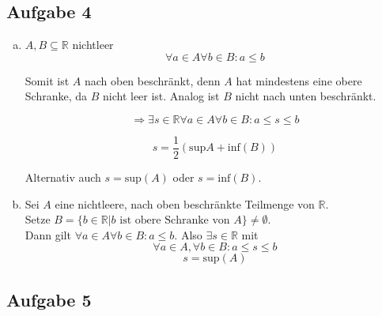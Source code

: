 \documentclass{article}
\begin{document}
\subsection*{Aufgabe 4}

\begin{enumerate}[(a)]
\item
  $A, B \subseteq \mathbb{R}$ nichtleer
  \[
    \forall a \in A \forall b \in B \colon a \leq b
  \]

  Somit ist $A$ nach oben beschränkt, denn $A$ hat mindestens eine obere Schranke, da $B$ nicht leer ist.
  Analog ist $B$ nicht nach unten beschränkt.


  \[
    \Rightarrow \exists s \in \mathbb{R} \forall a \in A \forall b \in B \colon a \leq s \leq b
  \]
  
  \[
    s = \frac{1}{2}(\text{sup}A + \text{inf}(B))
  \]

  Alternativ auch $s = \text{sup}(A)$ oder $s = \text{inf}(B)$.

\item Sei $A$ eine nichtleere, nach oben beschränkte Teilmenge von $\mathbb{R}$. \\
  Setze $B = \{ b \in \mathbb{R} | b \text{ ist obere Schranke von } A \} \ne \emptyset$. \\
  Dann gilt $\forall a \in A \forall b \in B \colon a \leq b$. Also $\exists s \in \mathbb{R}$
  mit
  \[
    \forall a \in A, \forall b \in B: a \leq s \leq b
  \]
  \[
    s = \text{sup}(A) 
  \]

\end{enumerate}

\subsection*{Aufgabe 5}
\end{document}
